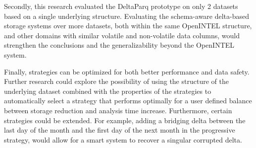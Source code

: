 Secondly, this research evaluated the DeltaParq prototype on only 2 datasets based on a single underlying structure. Evaluating the 
schema-aware delta-based storage systems over more datasets, both within the same OpenINTEL structure, and other domains with similar 
volatile and non-volatile data columns, would strengthen the conclusions and the generalizability beyond the OpenINTEL system.

Finally, strategies can be optimized for both better performance and data safety.
Further research could explore the possibility of using the structure of the underlying dataset combined with the 
properties of the strategies to automatically select a strategy that performs optimally for a user defined balance 
between storage reduction and analysis time increase. Furthermore, certain strategies could be extended. For example,
adding a bridging delta between the last day of the month and the first day of the next month in the progressive strategy, 
would allow for a smart system to recover a singular corrupted delta.


